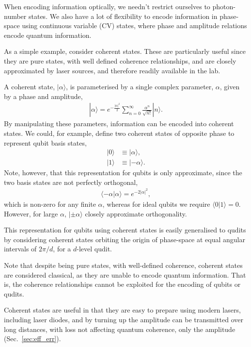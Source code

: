 \documentclass[aps,rmp,twocolumn,amsmath,amssymb,nofootinbib,superscriptaddress]{revtex4}
\newcommand{\ket}[1]{|#1\rangle}
\begin{document}
When encoding information optically, we needn't restrict ourselves to photon-number states. We also have a lot of flexibility to encode information in phase-space using continuous variable (CV) states, where phase and amplitude relations encode quantum information.

As a simple example, consider coherent states. These are particularly useful since they are pure states, with well defined coherence relationships, and are closely approximated by laser sources, and therefore readily available in the lab.

A coherent state, $\ket\alpha$, is parameterised by a single complex parameter, $\alpha$, given by a phase and amplitude,
\begin{align}
\ket{\alpha} = e^{-\frac{|\alpha|^2}{2}} \sum_{n=0}^\infty \frac{\alpha^n}{\sqrt{n!}} \ket{n}.
\end{align}
By manipulating these parameters, information can be encoded into coherent states. We could, for example, define two coherent states of opposite phase to represent qubit basis states,
\begin{align}
\ket{0} &\equiv \ket{\alpha}, \nonumber \\
\ket{1} &\equiv \ket{-\alpha}.
\end{align}
Note, however, that this representation for qubits is only approximate, since the two basis states are not perfectly orthogonal,
\begin{align}
\langle -\alpha|\alpha \rangle = e^{-2|\alpha|^2},
\end{align}
which is non-zero for any finite $\alpha$, whereas for ideal qubits we require \mbox{$\langle 0|1\rangle = 0$}. However, for large $\alpha$, $\ket{\pm\alpha}$ closely approximate orthogonality.

This representation for qubits using coherent states is easily generalised to qudits by considering coherent states orbiting the origin of phase-space at equal angular intervals of \mbox{$2\pi/d$}, for a $d$-level qudit.

Note that despite being pure states, with well-defined coherence, coherent states are considered classical, as they are unable to encode quantum information. That is, the coherence relationships cannot be exploited for the encoding of qubits or qudits.

Coherent states are useful in that they are easy to prepare using modern lasers, including laser diodes, and by turning up the amplitude can be transmitted over long distances, with loss not affecting quantum coherence, only the amplitude (Sec.~\ref{sec:eff_err}).
\end{document}
